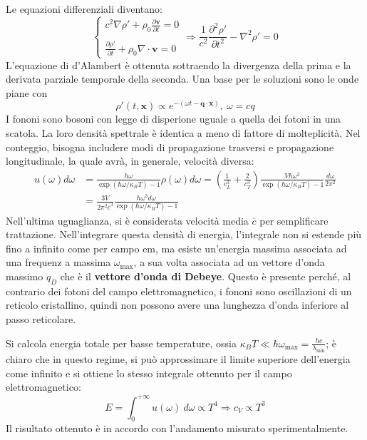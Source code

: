\documentclass[10pt, a4paper]{scrartcl}
\numberwithin{equation}{subsection}
\theoremstyle{style1}
\begin{document}
Le equazioni differenziali diventano:
\begin{equation}
	\begin{cases}
		\displaystyle c^2 \nabla  \rho  ' + \rho _0 \frac{\partial \mathbf{v} }{\partial t} = 0 \\
		\\
		 \displaystyle \frac{\partial \rho '}{\partial t} + \rho _0 \nabla \cdot \mathbf{v} = 0 
	\end{cases} \Longrightarrow \frac{1}{c^2}\frac{\partial ^2 \rho '}{\partial t^2} - \nabla ^2 \rho ' = 0
\end{equation}
L'equazione di d'Alambert \`e ottenuta sottraendo la divergenza della prima e la derivata parziale temporale della seconda.
Una base per le soluzioni sono le onde piane con
\begin{equation}
	\rho '(t,\mathbf{x} ) \propto e^{- (\omega t - \mathbf{q} \cdot \mathbf{x} )} , \ \omega = cq
\end{equation}
I fononi sono bosoni con legge di disperione uguale a quella dei fotoni in una scatola.
La loro densit\`a spettrale \`e identica a meno di fattore di molteplicit\`a.
Nel conteggio, bisogna includere modi di propagazione trasversi e propagazione longitudinale, la quale avr\`a, in generale, velocit\`a diversa:
\begin{equation}
	\begin{split}
		u(\omega) d\omega &= \frac{\hbar \omega}{\exp(\hbar \omega/\kappa _B T) - 1} \rho (\omega) d\omega = \left(\frac{1}{c_L^3  }+\frac{2}{c_T ^3}\right) \frac{V\hbar \omega^3}{\exp(\hbar \omega / \kappa _B T)-1}\frac{d\omega}{2\pi^2}\\
		&= \frac{3V}{2\pi^2 \overline{c}^3} \frac{\hbar  \omega^3 d\omega}{\exp(\hbar \omega / \kappa _B T ) -1}
	\end{split}
\end{equation}
Nell'ultima uguaglianza, si \`e considerata velocit\`a media $\overline{c}$ per semplificare trattazione. 
Nell'integrare questa densit\`a di energia, l'integrale non si estende pi\`u fino a infinito come per campo em, ma esiste un'energia massima associata ad una frequenz a massima $\omega_\text{max}$, a sua volta associata ad un vettore d'onda massimo $q_D$ che \`e il \textbf{vettore d'onda di Debeye}. Questo \`e presente perch\'e, al contrario dei fotoni del campo elettromagnetico, i fononi sono oscillazioni di un reticolo cristallino, quindi non possono avere una lunghezza d'onda inferiore al passo reticolare.

Si calcola energia totale per basse temperature, ossia $\kappa _B T \ll \hbar \omega_\text{max} = \frac{hc}{\lambda _\text{min}}$; \`e chiaro che in questo regime, si pu\`o approssimare il limite superiore dell'energia come infinito e si ottiene lo stesso integrale ottenuto per il campo elettromagnetico:
\begin{equation}
	E = \int_{0} ^{+\infty} u(\omega) \ d\omega \propto T^4 \Rightarrow c_V \propto T^3
\end{equation}
Il risultato ottenuto \`e in accordo con l'andamento misurato sperimentalmente.
\end{document}
